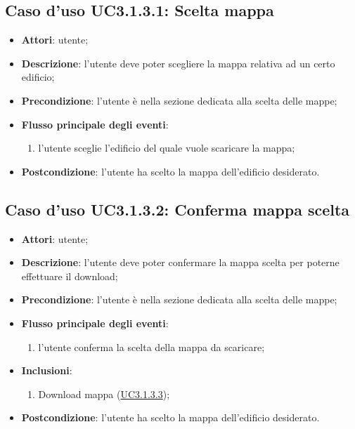 \documentclass[../AnalisiDeiRequisiti.tex]{subfiles}
\begin{document}
\subsection{Caso d'uso UC3.1.3.1: Scelta mappa}
\begin{itemize}
\item \textbf{Attori}: utente;
\item \textbf{Descrizione}: l'utente deve poter scegliere la mappa relativa ad un certo edificio; 
      \item \textbf{Precondizione}: l'utente è nella sezione dedicata alla scelta delle mappe;

        \item \textbf{Flusso principale degli eventi}:
          \begin{enumerate}
          \item l'utente sceglie l'edificio del quale vuole scaricare la mappa;

      \end{enumerate}
    \item \textbf{Postcondizione}: l'utente ha scelto la mappa dell'edificio desiderato.
  \end{itemize}
\hypertarget{UC3.1.3.2}{}
\subsection{Caso d'uso UC3.1.3.2: Conferma mappa scelta}
\begin{itemize}
\item \textbf{Attori}: utente;
\item \textbf{Descrizione}: l'utente deve poter confermare la mappa scelta per poterne effettuare il download; 
      \item \textbf{Precondizione}: l'utente è nella sezione dedicata alla scelta delle mappe;

        \item \textbf{Flusso principale degli eventi}:
          \begin{enumerate}
          \item l'utente conferma la scelta della mappa da scaricare;        

      \end{enumerate}
    \item \textbf{Inclusioni}:
      \begin{enumerate}
          \item Download mappa (\hyperlink{UC3.1.3.3}{UC3.1.3.3});

      \end{enumerate}

    \item \textbf{Postcondizione}: l'utente ha scelto la mappa dell'edificio desiderato.
  \end{itemize}
\hypertarget{UC3.1.3.3}{}
\end{document}
